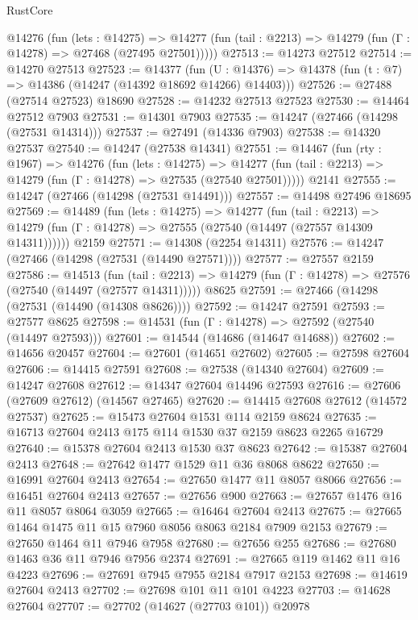 \begin{lexlean}{RustCore}
\begin{coremodule}
    @14276
      (fun (lets : @14275) =>
      @14277 (fun (tail : @2213) => @14279 (fun (Γ : @14278) => @27468 (@27495 @27501)))))
@27513 := @14273 @27512
@27514 := @14270 @27513
@27523 := @14377
    (fun (U : @14376) => @14378 (fun (t : @7) => @14386 (@14247 (@14392 @18692 @14266) @14403)))
@27526 := @27488 (@27514 @27523) @18690
@27528 := @14232 @27513 @27523
@27530 := @14464 @27512 @7903
@27531 := @14301 @7903
@27535 := @14247 (@27466 (@14298 (@27531 @14314)))
@27537 := @27491 (@14336 @7903)
@27538 := @14320 @27537
@27540 := @14247 (@27538 @14341)
@27551 := @14467
    (fun (rty : @1967) =>
    @14276
      (fun (lets : @14275) =>
      @14277 (fun (tail : @2213) => @14279 (fun (Γ : @14278) => @27535 (@27540 @27501)))))
    @2141
@27555 := @14247 (@27466 (@14298 (@27531 @14491)))
@27557 := @14498 @27496 @18695
@27569 := @14489
    (fun (lets : @14275) =>
    @14277
      (fun (tail : @2213) =>
      @14279 (fun (Γ : @14278) => @27555 (@27540 (@14497 (@27557 @14309 @14311))))))
    @2159
@27571 := @14308 (@2254 @14311)
@27576 := @14247 (@27466 (@14298 (@27531 (@14490 @27571))))
@27577 := @27557 @2159
@27586 := @14513
    (fun (tail : @2213) => @14279 (fun (Γ : @14278) => @27576 (@27540 (@14497 (@27577 @14311)))))
    @8625
@27591 := @27466 (@14298 (@27531 (@14490 (@14308 @8626))))
@27592 := @14247 @27591
@27593 := @27577 @8625
@27598 := @14531 (fun (Γ : @14278) => @27592 (@27540 (@14497 @27593)))
@27601 := @14544 (@14686 (@14647 @14688))
@27602 := @14656 @20457
@27604 := @27601 (@14651 @27602)
@27605 := @27598 @27604
@27606 := @14415 @27591
@27608 := @27538 (@14340 @27604)
@27609 := @14247 @27608
@27612 := @14347 @27604 @14496 @27593
@27616 := @27606 (@27609 @27612) (@14567 @27465)
@27620 := @14415 @27608 @27612 (@14572 @27537)
@27625 := @15473 @27604 @1531 @114 @2159 @8624
@27635 := @16713 @27604 @2413 @175 @114 @1530 @37 @2159 @8623 @2265 @16729
@27640 := @15378 @27604 @2413 @1530 @37 @8623
@27642 := @15387 @27604 @2413
@27648 := @27642 @1477 @1529 @11 @36 @8068 @8622
@27650 := @16991 @27604 @2413
@27654 := @27650 @1477 @11 @8057 @8066
@27656 := @16451 @27604 @2413
@27657 := @27656 @900
@27663 := @27657 @1476 @16 @11 @8057 @8064 @3059
@27665 := @16464 @27604 @2413
@27675 := @27665 @1464 @1475 @11 @15 @7960 @8056 @8063 @2184 @7909 @2153
@27679 := @27650 @1464 @11 @7946 @7958
@27680 := @27656 @255
@27686 := @27680 @1463 @36 @11 @7946 @7956 @2374
@27691 := @27665 @119 @1462 @11 @16 @4223
@27696 := @27691 @7945 @7955 @2184 @7917 @2153
@27698 := @14619 @27604 @2413
@27702 := @27698 @101 @11 @101 @4223
@27703 := @14628 @27604
@27707 := @27702 (@14627 (@27703 @101)) @20978

\end{coremodule}
\end{lexlean}
